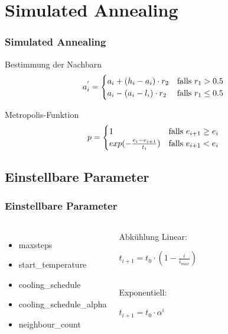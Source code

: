 \section{Simulated Annealing}

\begin{frame}
\frametitle{Simulated Annealing}
    \begin{block}{Bestimmung der Nachbarn}
       \begin{equation}
           a_{i}^{'} =
           \begin{cases}
               a_i + (h_i - a_i) \cdot r_2 & \text{falls } r_1 > 0.5 \\
               a_i - (a_i - l_i) \cdot r_2 & \text{falls } r_1 \le 0.5 \notag
           \end{cases}
       \end{equation}
   \end{block}
   \begin{block}{Metropolis-Funktion}
       \begin{equation}
              p =
              \begin{cases}
                  1 & \text{falls } e_{i+1} \ge e_i \\
                  exp(- \frac{e_i - e_{i+1}}{t_i}) & \text{falls } e_{i+1} < e_i \notag
              \end{cases}
          \end{equation}
      \end{block}
\end{frame}

\subsection{Einstellbare Parameter}

\begin{frame}
\frametitle{Einstellbare Parameter}
    \begin{columns}
        \begin{itemize}
            \item maxsteps
            \item start\_temperature
            \item cooling\_schedule
            \item cooling\_schedule\_alpha
            \item neighbour\_count
        \end{itemize}
        \begin{block}{Abkühlung}
           Linear: \centerline{$ t_{i+1} = t_0 \cdot ( 1 - \frac{i}{i_{max}}) $} \\
           Exponentiell: \centerline{$ t_{i+1} = t_0 \cdot \alpha^i $} \\
        \end{block}
    \end{columns}
\end{frame}


